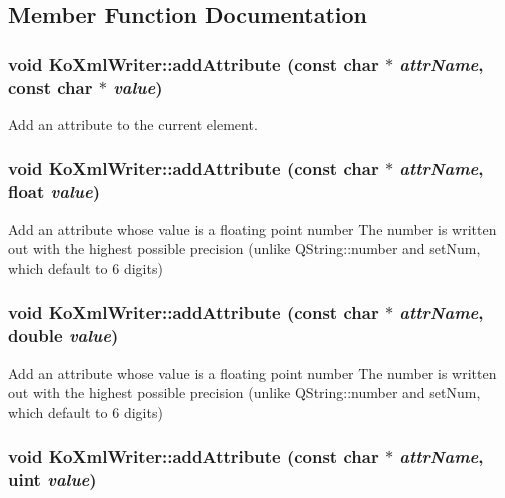 \subsection{Member Function Documentation}
\hypertarget{classKoXmlWriter_a920571457da436ac3c6e7f8f0521e48c}{
\subsubsection[{addAttribute}]{\setlength{\rightskip}{0pt plus 5cm}void KoXmlWriter::addAttribute (const char $\ast$ {\em attrName}, \/  const char $\ast$ {\em value})}}
\label{classKoXmlWriter_a920571457da436ac3c6e7f8f0521e48c}
Add an attribute to the current element. \hypertarget{classKoXmlWriter_af824c78438951baaad9c79cf7c1267a7}{
\subsubsection[{addAttribute}]{\setlength{\rightskip}{0pt plus 5cm}void KoXmlWriter::addAttribute (const char $\ast$ {\em attrName}, \/  float {\em value})}}
\label{classKoXmlWriter_af824c78438951baaad9c79cf7c1267a7}
Add an attribute whose value is a floating point number The number is written out with the highest possible precision (unlike QString::number and setNum, which default to 6 digits) \hypertarget{classKoXmlWriter_a70f154aa14a29bfedc6fc8a8db65274d}{
\subsubsection[{addAttribute}]{\setlength{\rightskip}{0pt plus 5cm}void KoXmlWriter::addAttribute (const char $\ast$ {\em attrName}, \/  double {\em value})}}
\label{classKoXmlWriter_a70f154aa14a29bfedc6fc8a8db65274d}
Add an attribute whose value is a floating point number The number is written out with the highest possible precision (unlike QString::number and setNum, which default to 6 digits) \hypertarget{classKoXmlWriter_ae3103a2a23b5a037272ccae9a378d5d2}{
\subsubsection[{addAttribute}]{\setlength{\rightskip}{0pt plus 5cm}void KoXmlWriter::addAttribute (const char $\ast$ {\em attrName}, \/  uint {\em value})}}
